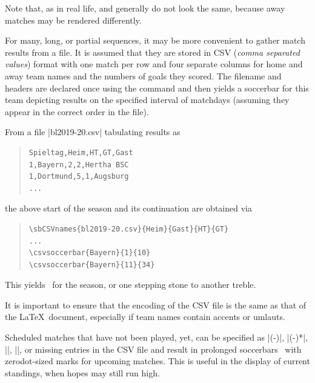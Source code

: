 \documentclass[a4paper,12pt]{ltxdoc}
\begin{document}
\begin{description}
  Note that, as in real life,  and 
  generally do not look the same,
  because away matches may be rendered differently.
\item[\cs{csvsoccerbar}\marg{team}\marg{first match}\marg{last match}]
  For many, long, or partial sequences,
  it may be more convenient to gather match results from a file. 
  It is assumed that they are stored in CSV (\emph{comma separated values}) format
  with one match per row and four separate columns for
  home and away team names and the numbers of goals they scored.
  The filename and headers are declared once using the command 
  \linebreak[2]%
  \linebreak[2]\linebreak[2]%
  \linebreak[2]
  and \linebreak[2]%
  \linebreak[2]
  then yields a soccerbar for this team depicting results
  on the specified interval of matchdays
  (assuming they appear in the correct order in the file).
  
  From a file |bl2019-20.csv| tabulating results as 
  \begin{quote}
  \begin{verbatim}
Spieltag,Heim,HT,GT,Gast
1,Bayern,2,2,Hertha BSC
1,Dortmund,5,1,Augsburg
...\end{verbatim}
  \end{quote}
  the above start of the season and its continuation are obtained via
  \begin{quote}
  \begin{verbatim}
\sbCSVnames{bl2019-20.csv}{Heim}{Gast}{HT}{GT}
...
\csvsoccerbar{Bayern}{1}{10}
\csvsoccerbar{Bayern}{11}{34}\end{verbatim}
  \end{quote}
  This yields
  \,%
  for the season, or one stepping stone to another treble.

  It is important to ensure that
  the encoding of the CSV file is the same as that of the \LaTeX\ document,
  especially if team names contain accents or umlauts.
\end{description}
Scheduled matches that have not been played, yet, can be specified as
|(-)|, |(-)*|, |\home{}{}|, |\away{}{}|, or missing entries in the CSV file
and result in prolonged soccerbars
\, %
with zerodot-sized marks for upcoming matches. 
This is useful in the display of current standings,
when hopes may still run high.
\end{document}

